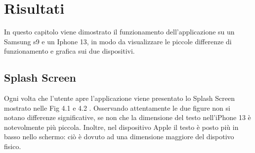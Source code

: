 \chapter{Risultati}
In questo capitolo viene dimostrato il funzionamento dell'applicazione su un Samsung s9 e un Iphone 13, in modo da visualizzare le piccole
differenze di funzionamento e grafica sui due dispositivi.
\section{Splash Screen}
Ogni volta che l'utente apre l'applicazione viene presentato lo Splash Screen mostrato nelle Fig 4.1 e 4.2 . Osservando attentamente le due figure non si notano differenze significative, se non che la dimensione del testo nell'iPhone 13 \`e notevolmente pi\`u piccola.
Inoltre, nel dispositivo Apple il testo \`e posto pi\`u in basso nello schermo: ci\`o \`e  dovuto ad una dimensione maggiore del dispotivo fisico.

